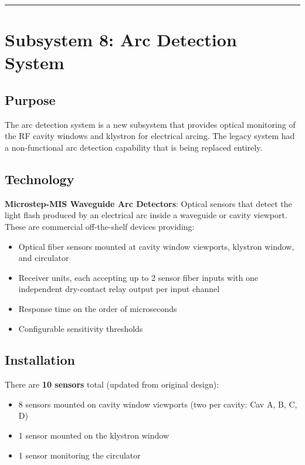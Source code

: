 \begin{center}\rule{0.5\linewidth}{0.5pt}\end{center}

\section{Subsystem 8: Arc Detection System}\label{subsystem-8-arc-detection-system}

\subsection{Purpose}\label{purpose-2}

The arc detection system is a new subsystem that provides optical monitoring of the RF cavity windows and klystron for electrical arcing. The legacy system had a non-functional arc detection capability that is being replaced entirely.

\subsection{Technology}\label{technology}

\textbf{Microstep-MIS Waveguide Arc Detectors}: Optical sensors that detect the light flash produced by an electrical arc inside a waveguide or cavity viewport. These are commercial off-the-shelf devices providing:

\begin{itemize}
\tightlist
\item
  Optical fiber sensors mounted at cavity window viewports, klystron window, and circulator
\item
  Receiver units, each accepting up to 2 sensor fiber inputs with one independent dry-contact relay output per input channel
\item
  Response time on the order of microseconds
\item
  Configurable sensitivity thresholds
\end{itemize}

\subsection{Installation}\label{installation}

There are \textbf{10 sensors} total (updated from original design):

\begin{itemize}
\tightlist
\item
  8 sensors mounted on cavity window viewports (two per cavity: Cav A, B, C, D)
\item
  1 sensor mounted on the klystron window
\item
  1 sensor monitoring the circulator
\end{itemize}

